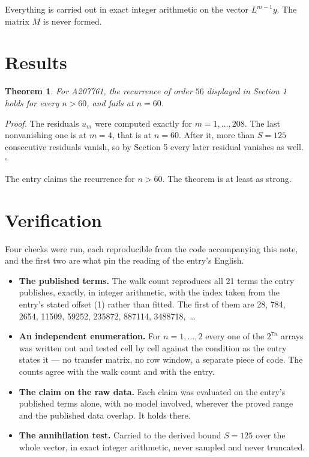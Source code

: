\documentclass[11pt]{article}
\newtheorem{theorem}{Theorem}
\theoremstyle{definition}
\begin{document}
Everything is carried out in exact integer arithmetic on the vector $L^{m-1}y$. The matrix $M$ is never formed.

\section{Results}

\begin{theorem} For A207761, the recurrence of order $56$ displayed in Section 1 holds for every $n > 60$, and fails at $n = 60$.\end{theorem}

{\itshape Proof.} The residuals $u_m$ were computed exactly for $m = 1,\dots,208$. The last nonvanishing one is at $m = 4$, that is at $n = 60$. After it, more than $S = 125$ consecutive residuals vanish, so by Section 5 every later residual vanishes as well. $\square$

The entry claims the recurrence for $n > 60$. The theorem is at least as strong.

\section{Verification}

Four checks were run, each reproducible from the code accompanying this note, and the first two are what pin the reading of the entry's English.

\begin{itemize}

\item {\bfseries The published terms.} The walk count reproduces all 21 terms the entry publishes, exactly, in integer arithmetic, with the index taken from the entry's stated offset (1) rather than fitted. The first of them are 28, 784, 2654, 11509, 59252, 235872, 887114, 3488718,~\dots

\item {\bfseries An independent enumeration.} For $n = 1,\dots,2$ every one of the $2^{7n}$ arrays was written out and tested cell by cell against the condition as the entry states it --- no transfer matrix, no row window, a separate piece of code. The counts agree with the walk count and with the entry.

\item {\bfseries The claim on the raw data.} Each claim was evaluated on the entry's published terms alone, with no model involved, wherever the proved range and the published data overlap. It holds there.

\item {\bfseries The annihilation test.} Carried to the derived bound $S = 125$ over the whole vector, in exact integer arithmetic, never sampled and never truncated.

\end{itemize}
\end{document}
